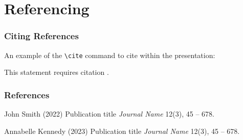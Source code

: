 \documentclass[
	12pt, %
]{beamer}
\begin{document}
\section{Referencing}

\begin{frame}
	\frametitle{Citing References}
	
	An example of the \texttt{\textbackslash cite} command to cite within the presentation:
	
	\bigskip %
	
	This statement requires citation \cite{p1,p2}.
\end{frame}


\begin{frame} %
	\frametitle{References}
	
	\begin{thebibliography}{99} %
		\footnotesize %
		
			John Smith (2022)
			\newblock Publication title
			\newblock \emph{Journal Name} 12(3), 45 -- 678.
			
			Annabelle Kennedy (2023)
			\newblock Publication title
			\newblock \emph{Journal Name} 12(3), 45 -- 678.
	\end{thebibliography}
\end{frame}

\end{document}
